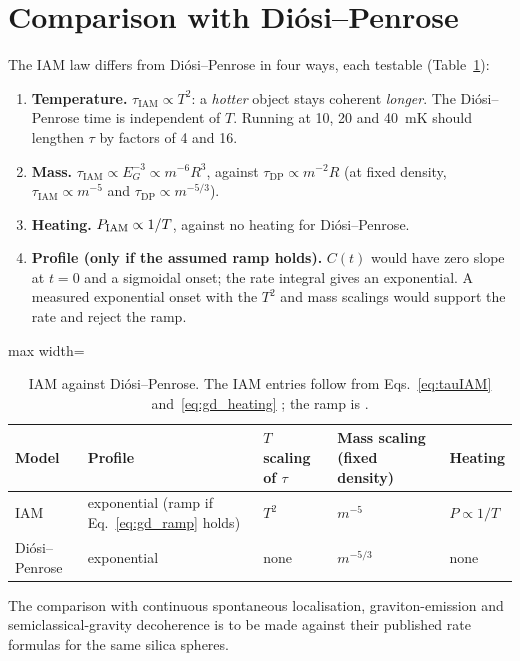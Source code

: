 \section{Comparison with Di\'osi--Penrose}\label{sec:gd_compare}
The IAM law differs from Di\'osi--Penrose in four ways, each testable (Table~\ref{tab:gd_compare}):
\begin{enumerate}
 \item \textbf{Temperature.} $\tau_{\mathrm{IAM}}\propto T^2$: a \emph{hotter} object stays coherent \emph{longer}. The Di\'osi--Penrose time is independent
       of $T$. Running at 10, 20 and 40~mK should lengthen $\tau$ by factors of 4 and 16.
 \item \textbf{Mass.} $\tau_{\mathrm{IAM}}\propto E_G^{-3}\propto m^{-6}R^3$, against $\tau_{\mathrm{DP}}\propto m^{-2}R$ (at fixed density,
       $\tau_{\mathrm{IAM}}\propto m^{-5}$ and $\tau_{\mathrm{DP}}\propto m^{-5/3}$).
 \item \textbf{Heating.} $P_{\rm IAM}\propto1/T$, against no heating for Di\'osi--Penrose.
 \item \textbf{Profile (only if the assumed ramp holds).} $C(t)$ would have zero slope at $t=0$ and a sigmoidal onset; the rate integral gives an exponential.
       A measured exponential onset with the $T^2$ and mass scalings would support the rate and reject the ramp.
\end{enumerate}

\begin{table}[htbp]\centering\small
\caption{IAM against Di\'osi--Penrose. The IAM entries follow from Eqs.~\eqref{eq:tauIAM} and~\eqref{eq:gd_heating} \calc; the ramp is \conjecture.}\label{tab:gd_compare}
\begin{adjustbox}{max width=\textwidth}
\begin{tabular}{lllll}
\hline
Model & Profile & $T$ scaling of $\tau$ & Mass scaling (fixed density) & Heating\\\hline
IAM & exponential (ramp if Eq.~\eqref{eq:gd_ramp} holds) & $T^2$ & $m^{-5}$ & $P\propto1/T$\\
Di\'osi--Penrose & exponential & none & $m^{-5/3}$ & none\\\hline
\end{tabular}
\end{adjustbox}
\end{table}
The comparison with continuous spontaneous localisation, graviton-emission and semiclassical-gravity decoherence is to be made against their published rate
formulas for the same silica spheres. \openprob

